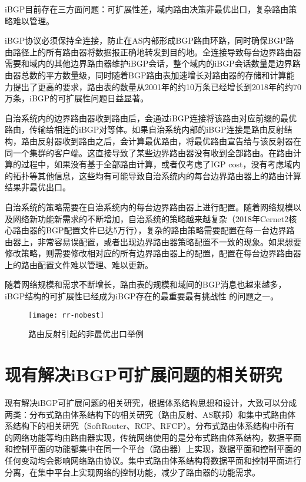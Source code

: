 iBGP\cite{Oprescu2011Rethinking}目前存在三方面问题：可扩展性差，域内路由决策非最优出口，复杂路由策略难以管理。

iBGP协议必须保持全连接，防止在AS内部形成BGP路由环路，同时确保BGP路由路径上的所有路由器将数据报正确地转发到目的地。全连接导致每台边界路由器需要和域内的其他边界路由器维护iBGP会话，整个域内的iBGP会话数量是边界路由器总数的平方数量级，同时随着BGP路由表加速增长对路由器的存储和计算能力提出了更高的要求，路由表的数量从2001年的约10万条已经增长到2018年的约70万条，iBGP的可扩展性问题日益显著。

自治系统内的边界路由器收到路由后，会通过iBGP连接将该路由对应前缀的最优路由，传输给相连的iBGP对等体。如果自治系统内部的iBGP连接是路由反射结构，路由反射器收到路由之后，会计算最优路由，将最优路由宣告给与该反射器在同一个集群的客户端。这直接导致了某些边界路由器没有收到全部路由。在路由计算的过程中，如果没有基于全部路由计算，或者仅考虑了IGP cost，没有考虑域内的拓扑等其他信息，这些均有可能导致自治系统内的每台边界路由器上的路由计算结果非最优出口。

自治系统的策略需要在自治系统内的每台边界路由器上进行配置。随着网络规模以及网络新功能新需求的不断增加，自治系统的策略越来越复杂（2018年Cernet2核心路由器的BGP配置文件已达5万行），复杂的路由策略需要配置在每一台边界路由器上，非常容易误配置，或者出现边界路由器策略配置不一致的现象。如果想要修改策略，则需要修改相对应的所有边界路由器上的配置，配置在每台边界路由器上的路由配置文件难以管理、难以更新。

随着网络规模和需求不断增长，路由表的规模和域间的BGP消息也越来越多，iBGP结构的可扩展性已经成为iBGP存在的最重要最有挑战性 的问题之一。

\begin{figure}
  \centering
  \texttt{[image: rr-nobest]}
  \caption{路由反射引起的非最优出口举例\cite{Feamster2004The}}
  \label{fig:rr-nobest}
\end{figure}

\section{现有解决iBGP可扩展问题的相关研究}
现有解决iBGP可扩展问题的相关研究，根据体系结构思想和设计，大致可以分成两类：分布式路由体系结构下的相关研究（路由反射\cite{rfc2796}、AS联邦\cite{rfc1965}）和集中式路由体系结构下的相关研究（SoftRouter\cite{lakshman2004}、RCP\cite{Feamster2004The}、RFCP\cite{RothenbergHotSDN}）。分布式路由体系结构中所有的网络功能等均由路由器实现，传统网络使用的是分布式路由体系结构，数据平面和控制平面的功能都集中在同一个平台（路由器）上实现，数据平面和控制平面的任何变动均会影响网络路由协议。集中式路由体系结构\cite{centralization}将数据平面和控制平面进行分离，在集中平台上实现网络的控制功能，减少了路由器的功能需求。

